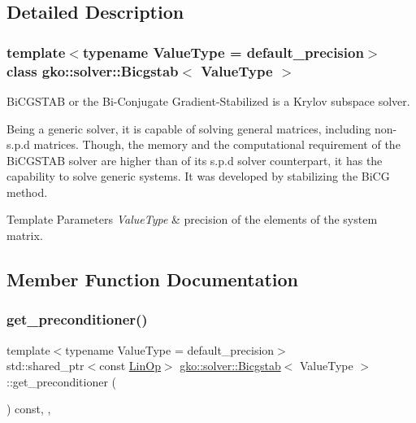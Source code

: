 \subsection{Detailed Description}
\subsubsection*{template$<$typename Value\+Type = default\+\_\+precision$>$\newline
class gko\+::solver\+::\+Bicgstab$<$ Value\+Type $>$}

Bi\+C\+G\+S\+T\+AB or the Bi-\/\+Conjugate Gradient-\/\+Stabilized is a Krylov subspace solver. 

Being a generic solver, it is capable of solving general matrices, including non-\/s.\+p.\+d matrices. Though, the memory and the computational requirement of the Bi\+C\+G\+S\+T\+AB solver are higher than of its s.\+p.\+d solver counterpart, it has the capability to solve generic systems. It was developed by stabilizing the Bi\+CG method.


\begin{DoxyTemplParams}{Template Parameters}
{\em Value\+Type} & precision of the elements of the system matrix. \\
\hline
\end{DoxyTemplParams}


\subsection{Member Function Documentation}
\mbox{\label{classgko_1_1solver_1_1Bicgstab_ac16d32672fbc91d8cfd7c0607c9771db}} 
\subsubsection{\texorpdfstring{get\+\_\+preconditioner()}{get\_preconditioner()}}
{\footnotesize\ttfamily template$<$typename Value\+Type  = default\+\_\+precision$>$ \\
std\+::shared\+\_\+ptr$<$const \hyperlink{classgko_1_1LinOp}{Lin\+Op}$>$ \hyperlink{classgko_1_1solver_1_1Bicgstab}{gko\+::solver\+::\+Bicgstab}$<$ Value\+Type $>$\+::get\+\_\+preconditioner (\begin{DoxyParamCaption}{ }\end{DoxyParamCaption}) const\hspace{0.3cm}{\ttfamily [inline]}, {\ttfamily [override]}, {\ttfamily [virtual]}}



